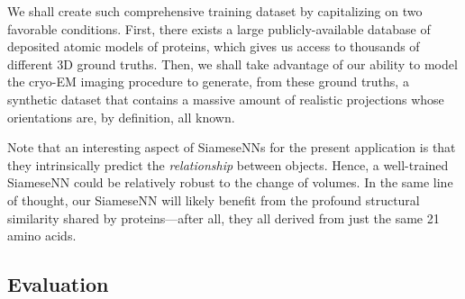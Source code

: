 We shall create such comprehensive training dataset by capitalizing on two favorable conditions.
First, there exists a large publicly-available database of deposited atomic models of proteins, which gives us access to thousands of different 3D ground truths.
Then, we shall take advantage of our ability to model the cryo-EM imaging procedure to generate, from these ground truths, a synthetic dataset that contains a massive amount of realistic projections whose orientations are, by definition, all known.

Note that an interesting aspect of SiameseNNs for the present application is that they intrinsically predict the \textit{relationship} between objects.
Hence, a well-trained SiameseNN could be relatively robust to the change of volumes.
In the same line of thought, our SiameseNN will likely benefit from the profound structural similarity shared by proteins---after all, they all derived from just the same 21 amino acids.

\subsection{Evaluation}\label{sec:results:evaluation}



